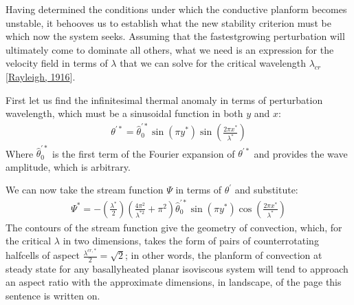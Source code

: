 \documentclass[letterpaper,10pt,english]{jupyterBook}
\begin{document}
\sphinxAtStartPar
Having determined the conditions under which the conductive planform becomes unstable, it behooves us to establish what the new stability criterion must be which now the system seeks. Assuming that the fastest\sphinxhyphen{}growing perturbation will ultimately come to dominate all others, what we need is an expression for the velocity field in terms of \(\lambda\) that we can solve for the critical wavelength \(\lambda_{cr}\) {[}\hyperlink{cite.references:id661}{Rayleigh, 1916}{]}.

\sphinxAtStartPar
First let us find the infinitesimal thermal anomaly in terms of perturbation wavelength, which must be a sinusoidal function in both \(y\) and \(x\):
\begin{equation*}
\begin{split} \theta^{'*} = \widehat{\theta}_0^{'*} \sin \left( \pi y^* \right) \sin \left( \frac{2 \pi x^*}{\lambda^*} \right) \end{split}
\end{equation*}
\sphinxAtStartPar
Where \(\widehat{\theta}_0^{'*}\) is the first term of the Fourier expansion of \(\theta^{'*}\) and provides the wave amplitude, which is arbitrary.

\sphinxAtStartPar
We can now take the stream function \(\Psi\) in terms of \(\theta^{'}\) and substitute:
\begin{equation*}
\begin{split} \Psi^* = - \left( \frac{\lambda^*}{2} \right) \left( \frac{4\pi^2}{\lambda^{*2}} + \pi^2 \right) \widehat{\theta}_0^{'*} \sin \left( \pi y^* \right) \cos \left( \frac{2 \pi x^*}{\lambda^*} \right) \end{split}
\end{equation*}
\sphinxAtStartPar
The contours of the stream function give the geometry of convection, which, for the critical \(\lambda\) in two dimensions, takes the form of pairs of counter\sphinxhyphen{}rotating half\sphinxhyphen{}cells of aspect \(\frac{\lambda^{cr, *}}{2}=\sqrt{2}\); in other words, the planform of convection at steady state for any basally\sphinxhyphen{}heated planar isoviscous system will tend to approach an aspect ratio with the approximate dimensions, in landscape, of the page this sentence is written on.
\end{document}
